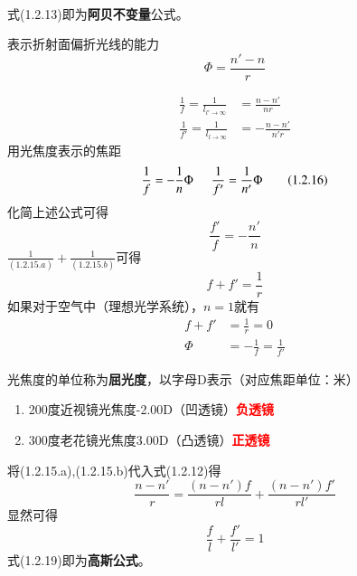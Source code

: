 \begin{description}[leftmargin=0.7cm,style=nextline,nosep]
\begin{align}
        \end{align}
        式(1.2.13)即为\textbf{阿贝不变量}公式。
    \item[光焦度]
        表示折射面偏折光线的能力
        \begin{equation}
            \Phi=\frac{n'-n}{r}\tag{1.2.14}
        \end{equation}
    \item[焦距]
        \begin{align}
            \frac{1}{f}=\frac{1}{l_{l' \to \infty}} & =\frac{n-n'}{nr} \tag{1.2.15.a}   \\
            \frac{1}{f'}=\frac{1}{l_{l \to \infty}} & =-\frac{n-n'}{n'r} \tag{1.2.15.b}
        \end{align}
        用光焦度表示的焦距
        \begin{equation}
            \frac{1}{f}= -\frac{1}{n} \Phi\hspace{0.5cm}  \frac{1}{f'}=\frac{1}{n'}\Phi\tag{1.2.16}
        \end{equation}
        化简上述公式可得
        \begin{equation}
            \frac{f'}{f}=-\frac{n'}{n}\tag{1.2.17}
        \end{equation}
        $\displaystyle \frac{1}{(1.2.15.a)}+\frac{1}{(1.2.15.b)}$可得
        \begin{equation}
            f+f'=\frac{1}{r}\tag{1.2.18}
        \end{equation}
        如果对于空气中（理想光学系统），$n=1$就有
        \begin{align}
                f+f'&=\frac{1}{r}=0\tag{1.2.18.a}\\
                \Phi&=-\frac{1}{f}=\frac{1}{f'}\tag{1.2.16.a}
        \end{align}

    \item[屈光度]
        光焦度的单位称为\textbf{屈光度}，以字母D表示（对应焦距单位：米）
        \begin{enumerate}[nosep]%
            \item  200度近视镜光焦度-2.00D（凹透镜）\textcolor{red}{\textbf{负透镜}}
            \item 300度老花镜光焦度3.00D（凸透镜）\textcolor{red}{\textbf{正透镜}}
        \end{enumerate}
    \item[高斯公式]
        将(1.2.15.a),(1.2.15.b)代入式(1.2.12)得
        \begin{equation}
            \frac{n-n'}{r}=\frac{(n-n')f}{rl}+\frac{(n-n')f'}{rl'}  \tag{1.2.19.bre1}
        \end{equation}
        显然可得
        \begin{equation}
            \frac{f}{l}+\frac{f'}{l'}=1 \tag{1.2.19}
        \end{equation}
        式(1.2.19)即为\textbf{高斯公式}。


\end{description}
